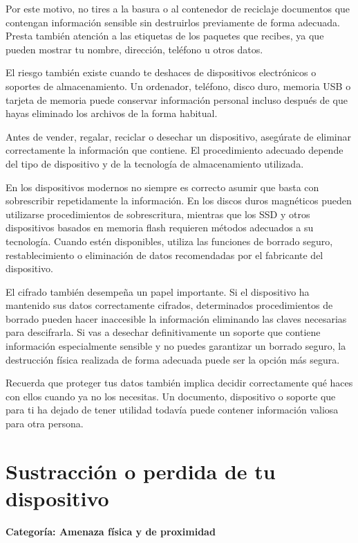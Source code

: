 \documentclass[
  spanish,
  a4paper,
  openany]{book}
\begin{document}
Por este motivo, no tires a la basura o al contenedor de reciclaje documentos que contengan información sensible sin destruirlos previamente de forma adecuada. Presta también atención a las etiquetas de los paquetes que recibes, ya que pueden mostrar tu nombre, dirección, teléfono u otros datos.

El riesgo también existe cuando te deshaces de dispositivos electrónicos o soportes de almacenamiento. Un ordenador, teléfono, disco duro, memoria USB o tarjeta de memoria puede conservar información personal incluso después de que hayas eliminado los archivos de la forma habitual.

Antes de vender, regalar, reciclar o desechar un dispositivo, asegúrate de eliminar correctamente la información que contiene. El procedimiento adecuado depende del tipo de dispositivo y de la tecnología de almacenamiento utilizada.

En los dispositivos modernos no siempre es correcto asumir que basta con sobrescribir repetidamente la información. En los discos duros magnéticos pueden utilizarse procedimientos de sobrescritura, mientras que los SSD y otros dispositivos basados en memoria flash requieren métodos adecuados a su tecnología. Cuando estén disponibles, utiliza las funciones de borrado seguro, restablecimiento o eliminación de datos recomendadas por el fabricante del dispositivo.

El cifrado también desempeña un papel importante. Si el dispositivo ha mantenido sus datos correctamente cifrados, determinados procedimientos de borrado pueden hacer inaccesible la información eliminando las claves necesarias para descifrarla. Si vas a desechar definitivamente un soporte que contiene información especialmente sensible y no puedes garantizar un borrado seguro, la destrucción física realizada de forma adecuada puede ser la opción más segura.

Recuerda que proteger tus datos también implica decidir correctamente qué haces con ellos cuando ya no los necesitas. Un documento, dispositivo o soporte que para ti ha dejado de tener utilidad todavía puede contener información valiosa para otra persona.

\section{Sustracción o perdida de tu dispositivo}\label{sustracciuxf3n-o-perdida-de-tu-dispositivo}

\textbf{Categoría: Amenaza física y de proximidad}
\end{document}
